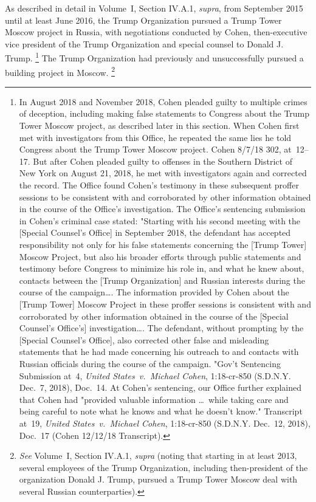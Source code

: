 {As described in detail in Volume~I, Section IV.A.1, \textit{supra}, from September 2015 until at least June 2016, the Trump Organization pursued a Trump Tower Moscow project in Russia, with negotiations conducted by Cohen, then-executive vice president of the Trump Organization and special counsel to Donald J. Trump.%
\footnote{In August 2018 and November 2018, Cohen pleaded guilty to multiple crimes of deception, including making false statements to Congress about the Trump Tower Moscow project, as described later in this section.
When Cohen first met with investigators from this Office, he repeated the same lies he told Congress about the Trump Tower Moscow project.
Cohen 8/7/18 302, at~12--17.
But after Cohen pleaded guilty to offenses in the Southern District of New York on August 21, 2018, he met with investigators again and corrected the record.
The Office found Cohen's testimony in these subsequent proffer sessions to be consistent with and corroborated by other information obtained in the course of the Office's investigation.
The Office's sentencing submission in Cohen's criminal case stated: "Starting with his second meeting with the [Special Counsel's Office] in September 2018, the defendant has accepted responsibility not only for his false statements concerning the [Trump Tower] Moscow Project, but also his broader efforts through public statements and testimony before Congress to minimize his role in, and what he knew about, contacts between the [Trump Organization] and Russian interests during the course of the campaign\dots.
The information provided by Cohen about the [Trump Tower] Moscow Project in these proffer sessions is consistent with and corroborated by other information obtained in the course of the [Special Counsel's Office's] investigation\dots.
The defendant, without prompting by the [Special Counsel's Office], also corrected other false and misleading statements that he had made concerning his outreach to and contacts with Russian officials during the course of the campaign.
"Gov't Sentencing Submission at~4, \textit{United States~v.\ Michael Cohen}, 1:18-cr-850 (S.D.N.Y. Dec.~7, 2018), Doc.~14.
At Cohen's sentencing, our Office further explained that Cohen had "provided valuable information \dots\ while taking care and being careful to note what he knows and what he doesn't know."
Transcript at~19, \textit{United States~v.\ Michael Cohen}, 1:18-cr-850 (S.D.N.Y. Dec.~12, 2018), Doc.~17 (Cohen 12/12/18 Transcript).}
The Trump Organization had previously and unsuccessfully pursued a building project in Moscow.%
\footnote{\textit{See} Volume~I, Section IV.A.1, \textit{supra} (noting that starting in at least 2013, several employees of the Trump Organization, including then-president of the organization Donald J. Trump, pursued a Trump Tower Moscow deal with several Russian counterparties).}
}
